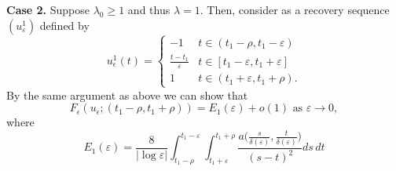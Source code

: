 \documentclass[12pt]{article}
\numberwithin{equation}{section}
\begin{document}
\smallskip
\noindent \textbf{Case 2.} Suppose $\lambda_{0}\ge1$ and thus $\lambda=1$. Then, consider as a recovery sequence $(u^{1}_{\varepsilon})$ defined by 
\begin{equation*}
    u^{1}_{\epsilon}(t)=
\begin{cases}
    -1 &t\in(t_{1}-\rho,t_{1}-\varepsilon)\\
    \frac{t-t_{1}}{\varepsilon}  &t\in[t_{1}-\varepsilon,t_{1}+\varepsilon]\\
    1 &t\in(t_{1}+\varepsilon,t_{1}+\rho).
\end{cases}
\end{equation*}
By the same argument as above we can show that 
\[
F_{\epsilon}(u_{\epsilon};(t_{1}-\rho,t_{1}+\rho))
=E_{1}(\varepsilon)+o(1)\,\,\text{as}\,\,\varepsilon\to0,
\]
where 
\[
E_{1}(\varepsilon)=\frac{8}{|\log{\varepsilon}|}\int_{t_{1}-\rho}^{t_{1}-\varepsilon}\int_{t_{1}+\varepsilon}^{t_{1}+\rho}\frac{a\big(\frac{s}{\delta(\varepsilon)},\frac{t}{\delta(\varepsilon)})}{(s-t)^{2}}ds\,dt
\]
\end{document}

